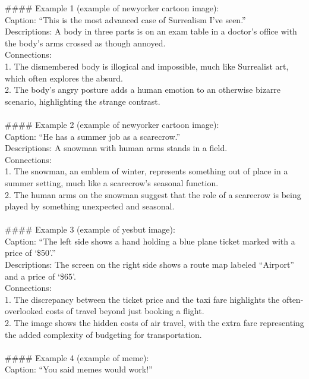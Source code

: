 \begin{figure*}[t]
\begin{tcolorbox}
\#\#\#\# Example 1 (example of newyorker cartoon image):\\
\text{[}Caption\text{]}: ``This is the most advanced case of Surrealism I've seen.''\\
\text{[}Descriptions\text{]}: A body in three parts is on an exam table in a doctor's office with the body's arms crossed as though annoyed.\\
\text{[}Connections\text{]}:\\
1. The dismembered body is illogical and impossible, much like Surrealist art, which often explores the absurd.\\
2. The body’s angry posture adds a human emotion to an otherwise bizarre scenario, highlighting the strange contrast.\\
\\
\#\#\#\# Example 2 (example of newyorker cartoon image):\\
\text{[}Caption\text{]}: ``He has a summer job as a scarecrow.''\\
\text{[}Descriptions\text{]}: A snowman with human arms stands in a field.\\
\text{[}Connections\text{]}:\\
1. The snowman, an emblem of winter, represents something out of place in a summer setting, much like a scarecrow's seasonal function.\\
2. The human arms on the snowman suggest that the role of a scarecrow is being played by something unexpected and seasonal.\\
\\
\#\#\#\# Example 3 (example of yesbut image):\\
\text{[}Caption\text{]}: ``The left side shows a hand holding a blue plane ticket marked with a price of `\$50'.''\\
\text{[}Descriptions\text{]}: The screen on the right side shows a route map labeled ``Airport'' and a price of `\$65'.\\
\text{[}Connections\text{]}:\\
1. The discrepancy between the ticket price and the taxi fare highlights the often-overlooked costs of travel beyond just booking a flight.\\
2. The image shows the hidden costs of air travel, with the extra fare representing the added complexity of budgeting for transportation.\\
\\
\#\#\#\# Example 4 (example of meme):\\
\text{[}Caption\text{]}: ``You said memes would work!''\\

\end{tcolorbox}
\end{figure*}
